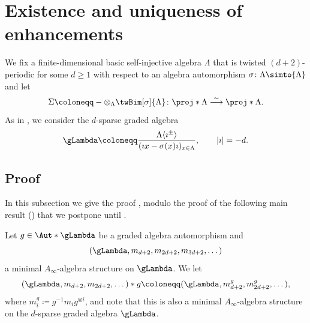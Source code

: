 \documentclass[a4paper]{amsart}
\begin{document}
\section{Existence and uniqueness of enhancements}
\label{sec:existence_and_uniqueness}

\begin{setting}
  \label{setting:existence_and_uniqueness}
  We fix a finite-dimensional basic self-injective algebra $\Lambda$ that is
  twisted ${(d+2)}$-periodic for some $d\geq 1$ with respect to an algebra automorphism
  $\sigma\colon \Lambda\simto{\Lambda}$ and let
  \[
    \Sigma\coloneqq-\otimes_{\Lambda}\twBim[\sigma]{\Lambda}\colon\proj*{\Lambda}\stackrel{\sim}{\longrightarrow}\proj*{\Lambda}.
  \]
  As in , we consider the $d$-sparse graded algebra
  \[
    \gLambda\coloneqq\frac{\Lambda\langle \imath^\pm\rangle}{(\imath
      x-\sigma(x)\imath)_{x\in\Lambda}},\qquad |\imath|=-d.
  \]
\end{setting}

\subsection{Proof }

In this subsection we give the proof ,
modulo the proof of the following main result () that
we postpone until .

\begin{notation}
  \label{not:g_action}
  Let $g\in\Aut*{\gLambda}$ be a graded algebra automorphism and
  \[
    (\gLambda,m_{d+2},m_{2d+2},m_{3d+2},\dots)
  \]
  a minimal $A_\infty$-algebra structure on $\gLambda$. We let
  \[
    (\gLambda,m_{d+2},m_{2d+2},\dots)*g\coloneqq(\gLambda,m_{d+2}^g,m_{2d+2}^g,\dots),
  \]
  where $m_i^g\coloneqq g^{-1}m_ig^{\otimes i}$, and note that this is also a
  minimal $A_\infty$-algebra structure on the $d$-sparse graded algebra
  $\gLambda$.
\end{notation}
\end{document}
